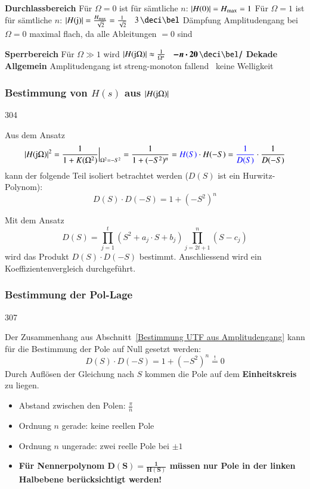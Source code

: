 \begin{outline}
    \1 \textbf{Durchlassbereich}
        \2 Für $\Omega = 0$ ist für sämtliche $n$: $|H(0)| = H_{\rm max} = 1$
        \2 Für $\Omega = 1$ ist für sämtliche $n$: $|H(\mathrm{j})| = \frac{H_{\rm max}}{\sqrt{2}} = \frac{1}{\sqrt{2}}$
            \textrightarrow\ $3 \, \deci \bel$ Dämpfung
        \2 Amplitudengang bei $\Omega = 0$ maximal flach, da alle Ableitungen $=0$ sind

    \1 \textbf{Sperrbereich}
        \2 Für $\Omega \gg 1$ wird $|H(\mathrm{j} \Omega)| \approx \frac{1}{\Omega^n}$ 
            \textrightarrow\ $\bm{- n \cdot 20 \, \deci \bel /}$ \textbf{Dekade}
    \1 \textbf{Allgemein}
        \2 Amplitudengang ist streng-monoton fallend \textrightarrow\ keine Welligkeit
\end{outline}


\subsubsection[Bestimmung von H(s) aus |H(jimg Omega)|]{Bestimmung von $H(s)$ aus $|H(\mathrm{j} \Omega)|$}{304}
\label{Bestimmung UTF aus Amplitudengang}

Aus dem Ansatz 
$$ | H(\mathrm{j} \Omega) |^2 = \frac{1}{1 + K(\Omega^2)} \Big|_{\Omega^2 = -S^2} = \frac{1}{1 + (-S^2)^n} = {\color{blue}H(S)} \cdot H(-S)
    = {\color{blue}\frac{1}{D(S)}} \cdot \frac{1}{D(-S)} $$
kann der folgende Teil isoliert betrachtet werden ($D(S)$ ist ein Hurwitz-Polynom):
$$ \boxed{ D(S) \cdot D(-S) = 1 + (-S^2)^n } $$

Mit dem Ansatz 
$$ \boxed{ D(S) = \prod\limits_{j=1}^{t} (S^2 + a_j \cdot S + b_j) \prod\limits_{j=2t+1}^{n} (S - c_j) } $$
wird das Produkt $D(S) \cdot D(-S)$ bestimmt. Anschliessend wird ein Koeffizientenvergleich durchgeführt.

\subsubsection{Bestimmung der Pol-Lage}{307}

Der Zusammenhang aus Abschnitt~\ref{Bestimmung UTF aus Amplitudengang} kann für die Bestimmung der Pole auf Null gesetzt werden:
$$ \boxed{ D(S) \cdot D(-S) = 1 + (-S^2)^n \overset{!}{=} 0 } $$
Durch Auflösen der Gleichung nach $S$ kommen die Pole auf dem \textbf{Einheitskreis} zu liegen.

\begin{itemize}
    \item Abstand zwischen den Polen: $\frac{\pi}{n}$
    \item Ordnung $n$ gerade: keine reellen Pole
    \item Ordnung $n$ ungerade: zwei reelle Pole bei $\pm 1$
    \item \textbf{Für Nennerpolynom $\bm{D(S) = \frac{1}{H(S)}}$ müssen nur Pole in der linken Halbebene berücksichtigt werden!}
\end{itemize}

